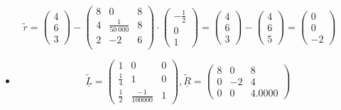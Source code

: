 \documentclass[12pt]{scrartcl}
\begin{document}
\begin{enumAlph}
\begin{itemize}
    \[
    \tilde{r}=\begin{pmatrix}
        4 \\ 6 \\ 3
    \end{pmatrix} -
    \begin{pmatrix}
        8 & 0                   & 8 \\
        4 & \frac{1}{50 \ 000}  & 8 \\
        2 & -2                  & 6 \\
    \end{pmatrix} \cdot \begin{pmatrix}
        -\frac{1}{2} \\ 0 \\ 1
    \end{pmatrix} = \begin{pmatrix}
        4 \\ 6 \\ 3
    \end{pmatrix} - \begin{pmatrix}
        4 \\ 6 \\ 5
    \end{pmatrix} = \begin{pmatrix}
        0 \\ 0 \\ -2
    \end{pmatrix}
    \]
    
    \end{itemize}

\newpage
\item \leavevmode

\begin{itemize}

    \item[I.]  \leavevmode
    \[
    \underline{\tilde{L}}=\begin{pmatrix}
      1 & 0 & 0 \\
      \frac{1}{4} & 1 & 0 \\
      \frac{1}{2} & \frac{-1}{100 000} & 1
    \end{pmatrix}, \underline{\tilde{R}}=\begin{pmatrix}
        8 & 0 & 8 \\
            0 & -2 & 4 \\
            0 & 0 & 4.0000
    \end{pmatrix}
    \]
    

\end{itemize}
\end{enumAlph}
\end{document}
